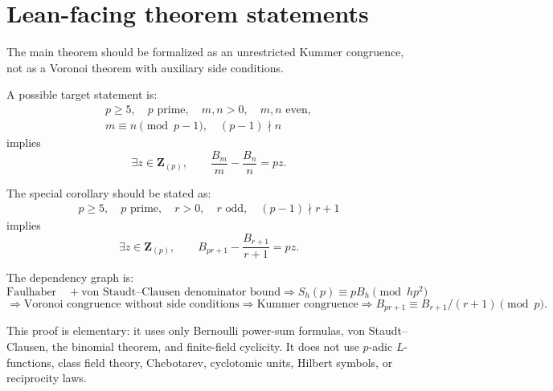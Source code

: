 \documentclass[11pt]{article}
\newcommand{\Z}{\mathbf Z}
\newcommand{\Bern}{B}
\begin{document}
\section{Lean-facing theorem statements}

The main theorem should be formalized as an unrestricted Kummer congruence,
not as a Voronoi theorem with auxiliary side conditions.

A possible target statement is:
\[
\begin{gathered}
  p\ge5,\quad p\text{ prime},\quad m,n>0,\quad m,n\text{ even},\\
  m\equiv n\pmod {p-1},\quad (p-1)\nmid n
\end{gathered}
\]
implies
\[
  \exists z\in\Z_{(p)},\qquad
  \frac{\Bern_m}{m}-\frac{\Bern_n}{n}=p z.
\]

The special corollary should be stated as:
\[
\begin{gathered}
  p\ge5,\quad p\text{ prime},\quad r>0,\quad r\text{ odd},\quad (p-1)\nmid r+1
\end{gathered}
\]
implies
\[
  \exists z\in\Z_{(p)},\qquad
  \Bern_{pr+1}-\frac{\Bern_{r+1}}{r+1}=p z.
\]

The dependency graph is:
\[
\boxed{\text{Faulhaber}}
\quad+
\boxed{\text{von Staudt--Clausen denominator bound}}
\Longrightarrow
\boxed{S_h(p)\equiv p\Bern_h\pmod {hp^2}}
\]
\[
\Longrightarrow
\boxed{\text{Voronoi congruence without side conditions}}
\Longrightarrow
\boxed{\text{Kummer congruence}}
\Longrightarrow
\boxed{\Bern_{pr+1}\equiv\Bern_{r+1}/(r+1)\pmod p}.
\]

This proof is elementary: it uses only Bernoulli power-sum formulas,
von Staudt--Clausen, the binomial theorem, and finite-field cyclicity.
It does not use $p$-adic $L$-functions, class field theory, Chebotarev,
cyclotomic units, Hilbert symbols, or reciprocity laws.
\end{document}

